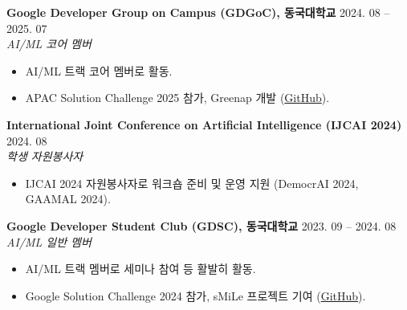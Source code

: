 \documentclass[10pt,a4paper]{article}
\newcommand{\cvheader}[1]{{\normalsize\bfseries #1}}
\newcommand{\cvposition}[1]{{\itshape #1}}
\newcommand{\cvdate}[1]{\hfill #1}
\begin{document}
\vspace{1pt}
\cvheader{Google Developer Group on Campus (GDGoC), 동국대학교} \cvdate{2024. 08 -- 2025. 07}\\
\cvposition{AI/ML 코어 멤버}
\begin{itemize}
    \item AI/ML 트랙 코어 멤버로 활동.
    \item APAC Solution Challenge 2025 참가, Greenap 개발 (\href{https://github.com/bk123477/2025-APAC-SolutionChallenge-Greenap}{GitHub}).
\end{itemize}

\vspace{1pt}
\cvheader{International Joint Conference on Artificial Intelligence (IJCAI 2024)} \cvdate{2024. 08}\\
\cvposition{학생 자원봉사자}
\begin{itemize}
    \item IJCAI 2024 자원봉사자로 워크숍 준비 및 운영 지원 (DemocrAI 2024, GAAMAL 2024).
\end{itemize}

\vspace{1pt}
\cvheader{Google Developer Student Club (GDSC), 동국대학교} \cvdate{2023. 09 -- 2024. 08}\\
\cvposition{AI/ML 일반 멤버}
\begin{itemize}
    \item AI/ML 트랙 멤버로 세미나 참여 등 활발히 활동.
    \item Google Solution Challenge 2024 참가, sMiLe 프로젝트 기여 (\href{https://github.com/bk123477/2024-SolutionChallenge-sMiLe}{GitHub}).
\end{itemize}
\end{document}
